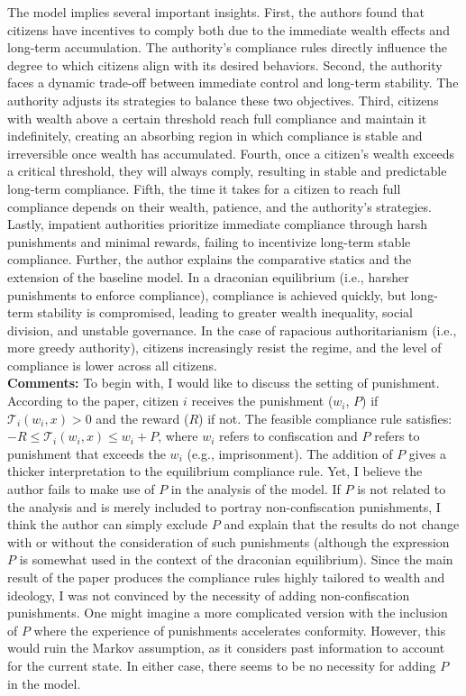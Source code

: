 \documentclass[10pt]{article}    %
\begin{document}
The model implies several important insights. First, the authors found that citizens have incentives to comply both due to the immediate wealth effects and long-term accumulation. The authority's compliance rules directly influence the degree to which citizens align with its desired behaviors. Second, the authority faces a dynamic trade-off between immediate control and long-term stability. The authority adjusts its strategies to balance these two objectives. Third, citizens with wealth above a certain threshold reach full compliance and maintain it indefinitely, creating an absorbing region in which compliance is stable and irreversible once wealth has accumulated. Fourth, once a citizen's wealth exceeds a critical threshold, they will always comply, resulting in stable and predictable long-term compliance. Fifth, the time it takes for a citizen to reach full compliance depends on their wealth, patience, and the authority's strategies. Lastly, impatient authorities prioritize immediate compliance through harsh punishments and minimal rewards, failing to incentivize long-term stable compliance. Further, the author explains the comparative statics and the extension of the baseline model. In a draconian equilibrium (i.e., harsher punishments to enforce compliance), compliance is achieved quickly, but long-term stability is compromised, leading to greater wealth inequality, social division, and unstable governance. In the case of rapacious authoritarianism (i.e., more greedy authority), citizens increasingly resist the regime, and the level of compliance is lower across all citizens. \\
\textbf{Comments:} To begin with, I would like to discuss the setting of punishment. According to the paper, citizen \(i\) receives the punishment (\(w_i\), \(P\)) if \(\mathcal{T}_i(w_i,x) > 0\) and the reward ($R$) if not. The feasible compliance rule satisfies: \(-R \leq \mathcal{T}_i(w_i,x) \leq w_i + P\), where \(w_i\) refers to confiscation and \(P\) refers to punishment that exceeds the \(w_i\) (e.g., imprisonment). The addition of \(P\) gives a thicker interpretation to the equilibrium compliance rule. Yet, I believe the author fails to make use of \(P\) in the analysis of the model. If \(P\) is not related to the analysis and is merely included to portray non-confiscation punishments, I think the author can simply exclude \(P\) and explain that the results do not change with or without the consideration of such punishments (although the expression \(P\) is somewhat used in the context of the draconian equilibrium). Since the main result of the paper produces the compliance rules highly tailored to wealth and ideology, I was not convinced by the necessity of adding non-confiscation punishments. One might imagine a more complicated version with the inclusion of \(P\) where the experience of punishments accelerates conformity. However, this would ruin the Markov assumption, as it considers past information to account for the current state. In either case, there seems to be no necessity for adding \(P\) in the model. \\
\end{document}
